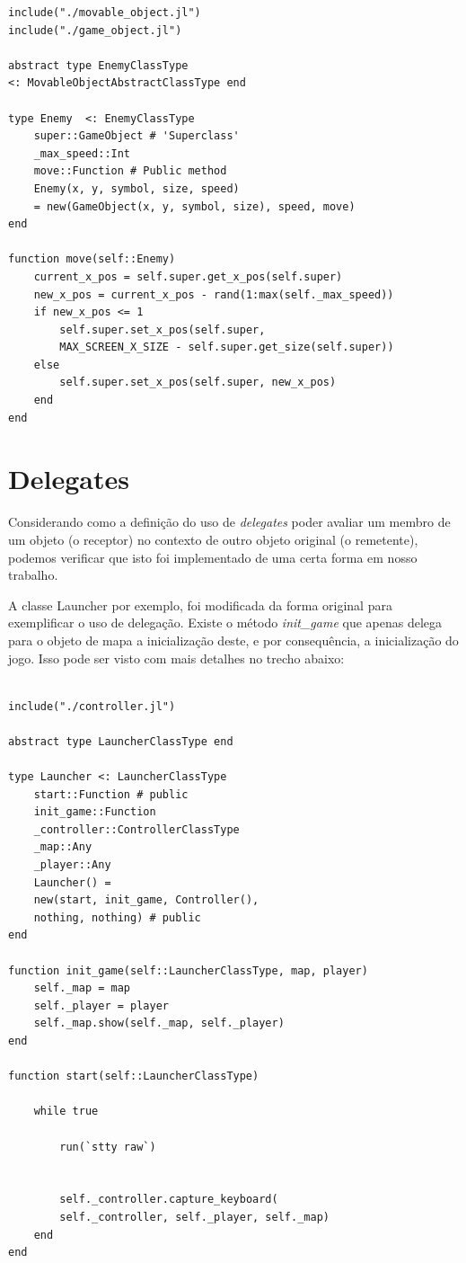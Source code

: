 \documentclass[rel_mlp]{iiufrgs}
\begin{document}
\begin{lstlisting}[frame=single]
include("./movable_object.jl")
include("./game_object.jl")

abstract type EnemyClassType  
<: MovableObjectAbstractClassType end  

type Enemy  <: EnemyClassType 
    super::GameObject # 'Superclass'
    _max_speed::Int
    move::Function # Public method
	Enemy(x, y, symbol, size, speed) 
	= new(GameObject(x, y, symbol, size), speed, move) 
end

function move(self::Enemy)
    current_x_pos = self.super.get_x_pos(self.super)
    new_x_pos = current_x_pos - rand(1:max(self._max_speed))
    if new_x_pos <= 1
        self.super.set_x_pos(self.super,
        MAX_SCREEN_X_SIZE - self.super.get_size(self.super))
    else
        self.super.set_x_pos(self.super, new_x_pos)
    end
end
\end{lstlisting}

\section{Delegates}
    
Considerando como a definição do uso de \textit{delegates} poder avaliar um membro de um objeto (o receptor) no contexto de outro objeto original (o remetente), podemos verificar que isto foi implementado de uma certa forma em nosso trabalho. 

A classe Launcher por exemplo, foi modificada da forma original para exemplificar o uso de delegação. Existe o método \textit{init\_game} que apenas delega para o objeto de mapa a inicialização deste, e por consequência, a inicialização do jogo. Isso pode ser visto com mais detalhes no trecho abaixo:

\begin{lstlisting}[frame=single]

include("./controller.jl")

abstract type LauncherClassType end  

type Launcher <: LauncherClassType
    start::Function # public
    init_game::Function
    _controller::ControllerClassType
    _map::Any
    _player::Any
	Launcher() = 
	new(start, init_game, Controller(),
	nothing, nothing) # public
end

function init_game(self::LauncherClassType, map, player)
    self._map = map
    self._player = player
    self._map.show(self._map, self._player)
end

function start(self::LauncherClassType)

    while true

        run(`stty raw`)	
                       
                      
        self._controller.capture_keyboard(
        self._controller, self._player, self._map)
    end
end

\end{lstlisting}
\end{document}
